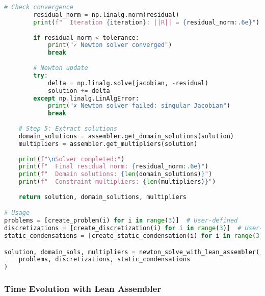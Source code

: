 \begin{lstlisting}[language=Python, caption=Complete Newton Solver Integration]
        # Check convergence
        residual_norm = np.linalg.norm(residual)
        print(f"  Iteration {iteration}: ||R|| = {residual_norm:.6e}")
        
        if residual_norm < tolerance:
            print("✓ Newton solver converged")
            break
        
        # Newton update
        try:
            delta = np.linalg.solve(jacobian, -residual)
            solution += delta
        except np.linalg.LinAlgError:
            print("✗ Newton solver failed: singular Jacobian")
            break
    
    # Step 5: Extract solutions
    domain_solutions = assembler.get_domain_solutions(solution)
    multipliers = assembler.get_multipliers(solution)
    
    print(f"\nSolver completed:")
    print(f"  Final residual norm: {residual_norm:.6e}")
    print(f"  Domain solutions: {len(domain_solutions)}")
    print(f"  Constraint multipliers: {len(multipliers)}")
    
    return solution, domain_solutions, multipliers

# Usage
problems = [create_problem(i) for i in range(3)]  # User-defined
discretizations = [create_discretization(i) for i in range(3)]  # User-defined
static_condensations = [create_static_condensation(i) for i in range(3)]  # User-defined

solution, domain_sols, multipliers = newton_solve_with_lean_assembler(
    problems, discretizations, static_condensations
)
\end{lstlisting}

\subsubsection{Time Evolution with Lean Assembler}

